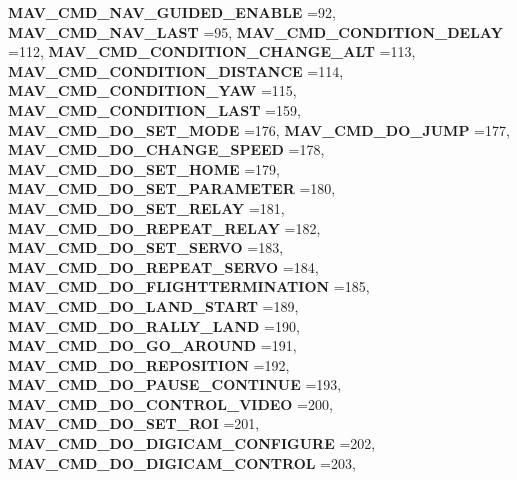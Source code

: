 \begin{DoxyCompactItemize}
\textbf{ M\+A\+V\+\_\+\+C\+M\+D\+\_\+\+N\+A\+V\+\_\+\+G\+U\+I\+D\+E\+D\+\_\+\+E\+N\+A\+B\+LE} =92, 
\textbf{ M\+A\+V\+\_\+\+C\+M\+D\+\_\+\+N\+A\+V\+\_\+\+L\+A\+ST} =95, 
\textbf{ M\+A\+V\+\_\+\+C\+M\+D\+\_\+\+C\+O\+N\+D\+I\+T\+I\+O\+N\+\_\+\+D\+E\+L\+AY} =112, 
\textbf{ M\+A\+V\+\_\+\+C\+M\+D\+\_\+\+C\+O\+N\+D\+I\+T\+I\+O\+N\+\_\+\+C\+H\+A\+N\+G\+E\+\_\+\+A\+LT} =113, 
\newline
\textbf{ M\+A\+V\+\_\+\+C\+M\+D\+\_\+\+C\+O\+N\+D\+I\+T\+I\+O\+N\+\_\+\+D\+I\+S\+T\+A\+N\+CE} =114, 
\textbf{ M\+A\+V\+\_\+\+C\+M\+D\+\_\+\+C\+O\+N\+D\+I\+T\+I\+O\+N\+\_\+\+Y\+AW} =115, 
\textbf{ M\+A\+V\+\_\+\+C\+M\+D\+\_\+\+C\+O\+N\+D\+I\+T\+I\+O\+N\+\_\+\+L\+A\+ST} =159, 
\textbf{ M\+A\+V\+\_\+\+C\+M\+D\+\_\+\+D\+O\+\_\+\+S\+E\+T\+\_\+\+M\+O\+DE} =176, 
\newline
\textbf{ M\+A\+V\+\_\+\+C\+M\+D\+\_\+\+D\+O\+\_\+\+J\+U\+MP} =177, 
\textbf{ M\+A\+V\+\_\+\+C\+M\+D\+\_\+\+D\+O\+\_\+\+C\+H\+A\+N\+G\+E\+\_\+\+S\+P\+E\+ED} =178, 
\textbf{ M\+A\+V\+\_\+\+C\+M\+D\+\_\+\+D\+O\+\_\+\+S\+E\+T\+\_\+\+H\+O\+ME} =179, 
\textbf{ M\+A\+V\+\_\+\+C\+M\+D\+\_\+\+D\+O\+\_\+\+S\+E\+T\+\_\+\+P\+A\+R\+A\+M\+E\+T\+ER} =180, 
\newline
\textbf{ M\+A\+V\+\_\+\+C\+M\+D\+\_\+\+D\+O\+\_\+\+S\+E\+T\+\_\+\+R\+E\+L\+AY} =181, 
\textbf{ M\+A\+V\+\_\+\+C\+M\+D\+\_\+\+D\+O\+\_\+\+R\+E\+P\+E\+A\+T\+\_\+\+R\+E\+L\+AY} =182, 
\textbf{ M\+A\+V\+\_\+\+C\+M\+D\+\_\+\+D\+O\+\_\+\+S\+E\+T\+\_\+\+S\+E\+R\+VO} =183, 
\textbf{ M\+A\+V\+\_\+\+C\+M\+D\+\_\+\+D\+O\+\_\+\+R\+E\+P\+E\+A\+T\+\_\+\+S\+E\+R\+VO} =184, 
\newline
\textbf{ M\+A\+V\+\_\+\+C\+M\+D\+\_\+\+D\+O\+\_\+\+F\+L\+I\+G\+H\+T\+T\+E\+R\+M\+I\+N\+A\+T\+I\+ON} =185, 
\textbf{ M\+A\+V\+\_\+\+C\+M\+D\+\_\+\+D\+O\+\_\+\+L\+A\+N\+D\+\_\+\+S\+T\+A\+RT} =189, 
\textbf{ M\+A\+V\+\_\+\+C\+M\+D\+\_\+\+D\+O\+\_\+\+R\+A\+L\+L\+Y\+\_\+\+L\+A\+ND} =190, 
\textbf{ M\+A\+V\+\_\+\+C\+M\+D\+\_\+\+D\+O\+\_\+\+G\+O\+\_\+\+A\+R\+O\+U\+ND} =191, 
\newline
\textbf{ M\+A\+V\+\_\+\+C\+M\+D\+\_\+\+D\+O\+\_\+\+R\+E\+P\+O\+S\+I\+T\+I\+ON} =192, 
\textbf{ M\+A\+V\+\_\+\+C\+M\+D\+\_\+\+D\+O\+\_\+\+P\+A\+U\+S\+E\+\_\+\+C\+O\+N\+T\+I\+N\+UE} =193, 
\textbf{ M\+A\+V\+\_\+\+C\+M\+D\+\_\+\+D\+O\+\_\+\+C\+O\+N\+T\+R\+O\+L\+\_\+\+V\+I\+D\+EO} =200, 
\textbf{ M\+A\+V\+\_\+\+C\+M\+D\+\_\+\+D\+O\+\_\+\+S\+E\+T\+\_\+\+R\+OI} =201, 
\newline
\textbf{ M\+A\+V\+\_\+\+C\+M\+D\+\_\+\+D\+O\+\_\+\+D\+I\+G\+I\+C\+A\+M\+\_\+\+C\+O\+N\+F\+I\+G\+U\+RE} =202, 
\textbf{ M\+A\+V\+\_\+\+C\+M\+D\+\_\+\+D\+O\+\_\+\+D\+I\+G\+I\+C\+A\+M\+\_\+\+C\+O\+N\+T\+R\+OL} =203, 

\end{DoxyCompactItemize}
